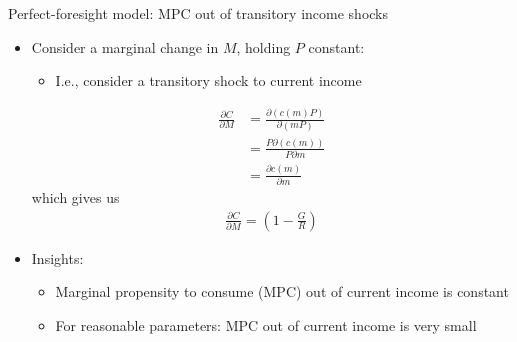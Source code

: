 \documentclass[9pt]{beamer}
\newcommand{\bit}{\begin{itemize}}
\newcommand{\eit}{\end{itemize}}
\begin{document}
%
%
%

\begin{frame}{Perfect-foresight model: MPC out of transitory income shocks}

\bit
\setlength\itemsep{1em}

\item Consider a marginal change in $M$, holding $P$ constant:
\bit
	\item I.e., consider a transitory shock to current income
\eit
\begin{align*}
\frac{\partial C}{\partial M} &= \frac{\partial \left(c(m)P\right)}{\partial \left(mP\right)} \\
&= \frac{P \partial \left(c(m)\right)}{P \partial m}  \\
&= \frac{\partial c(m)}{ \partial m}  
\end{align*}
which gives us
\begin{align*}
\frac{\partial C}{\partial M} = \left(1-\frac{G}{R}\right)
\end{align*}


\item Insights:
\bit
\setlength\itemsep{0.5em}
	\item Marginal propensity to consume (MPC) out of current income is constant
	\item For reasonable parameters: MPC out of current income is very small
\eit





\eit
\end{frame}
\end{document}
